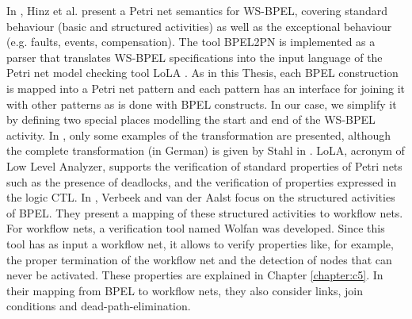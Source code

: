 In \cite{Hinz2005}, Hinz et al. present a Petri net semantics for WS-BPEL, covering
standard behaviour (basic and structured activities) as well as the exceptional behaviour (e.g.
faults, events, compensation). The tool BPEL2PN is implemented as a parser
that translates WS-BPEL specifications into the input language of the Petri
net model checking tool LoLA \cite{Schmidt2000}. As in this Thesis, each BPEL construction is mapped into a Petri net pattern and 
each pattern has an interface for joining it with other patterns as is done with BPEL constructs. In our case, we simplify it by defining two special places 
modelling the start and end of the WS-BPEL activity. In \cite{Hinz2005}, only some examples of the transformation are presented, although the
complete transformation (in German) is given by Stahl in \cite{Stahl2005}.
LoLA, acronym of Low Level Analyzer, supports the
verification of standard properties of Petri nets such as the presence of deadlocks, and the verification of properties expressed in
the logic CTL. In \cite{Verbeek2005}, Verbeek and van der Aalst focus on the structured activities of BPEL.
They present a mapping of these structured activities to workflow nets. For workflow nets, a verification tool named 
Wolfan \cite{Verbeek2000} was developed. Since this tool has as input a workflow net, it allows to verify properties like, for example,
the proper termination of the workflow net and the detection of nodes that can never be activated. 
These properties are explained in Chapter \ref{chapter:c5}. 
In their mapping from BPEL to workflow nets, they also consider links,
join conditions and dead-path-elimination. 

